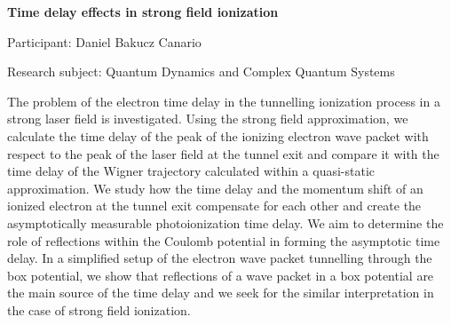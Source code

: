 \begin{minipage}[t]{1.0\textwidth}

\begin{center}

{{\large\bfseries Time delay effects in strong field ionization}\par}

\end{center}

{\noindent Participant: Daniel Bakucz Canario\par} 

{\noindent Research subject: Quantum Dynamics and Complex Quantum Systems\par}\medskip

\noindent The problem of the electron time delay in the tunnelling ionization process in a strong laser field is investigated. Using the strong field approximation, we calculate the time delay of the peak of the ionizing electron wave packet with respect to the peak of the laser field at the tunnel exit and compare it with the time delay of the Wigner trajectory calculated within a quasi-static approximation. We  study how the time delay and the momentum shift of an ionized electron at the tunnel exit compensate for each other and create the asymptotically measurable photoionization time delay.  We aim to determine the role of reflections within the Coulomb potential in forming the asymptotic time delay. In a simplified setup of the electron wave packet tunnelling through the box potential,  we show that reflections of a wave packet in a box potential are the main source of the time delay and  we seek for the similar interpretation in the case of strong field ionization.\par\end{minipage}

\hfill 

